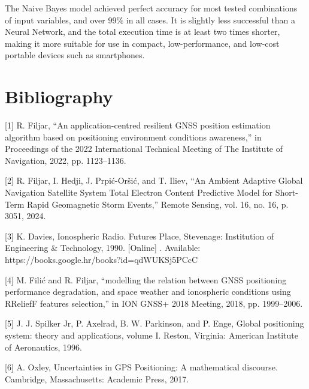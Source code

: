 \documentclass[sn-mathphys-num]{sn-jnl}%
\begin{document}
The Naive Bayes model achieved perfect accuracy for most tested combinations of input variables, and over $99\%$ in all cases. It is slightly less successful than a Neural Network, and the total execution time is at least two times shorter, making it more suitable for use in compact, low-performance, and low-cost portable devices such as smartphones.



\section{Bibliography}
[1] R. Filjar, “An application-centred resilient GNSS position estimation algorithm based on positioning environment conditions awareness,” in Proceedings of the 2022 International Technical Meeting of The Institute of Navigation, 2022, pp. 1123–1136.

[2] R. Filjar, I. Hedji, J. Prpić-Oršić, and T. Iliev, “An Ambient Adaptive Global Navigation Satellite System Total Electron Content Predictive Model for Short-Term Rapid Geomagnetic Storm Events,” Remote Sensing, vol. 16, no. 16, p. 3051, 2024.

[3] K. Davies, Ionospheric Radio. Futures Place, Stevenage: Institution of Engineering & Technology, 1990. [Online] . Available: https://books.google.hr/books?id=qdWUKSj5PCcC

[4] M. Filić and R. Filjar, “modelling the relation between GNSS positioning performance degradation, and space weather and ionospheric conditions using RReliefF features selection,” in ION GNSS+ 2018 Meeting, 2018, pp. 1999–2006.

[5] J. J. Spilker Jr, P. Axelrad, B. W. Parkinson, and P. Enge, Global positioning system: theory and applications, volume I. Reston, Virginia: American Institute of Aeronautics, 1996.

[6] A. Oxley, Uncertainties in GPS Positioning: A mathematical discourse. Cambridge, Massachusetts: Academic Press, 2017.
\end{document}
